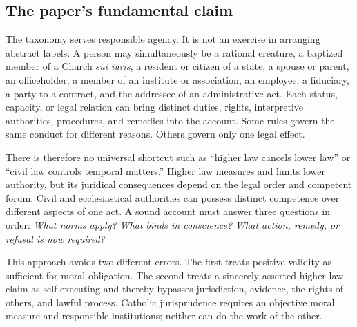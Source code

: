 \subsection{The paper's fundamental claim}

The taxonomy serves responsible agency. It is not an exercise in arranging abstract labels. A person may simultaneously be a rational creature, a baptized member of a Church \emph{sui iuris}, a resident or citizen of a state, a spouse or parent, an officeholder, a member of an institute or association, an employee, a fiduciary, a party to a contract, and the addressee of an administrative act. Each status, capacity, or legal relation can bring distinct duties, rights, interpretive authorities, procedures, and remedies into the account. Some rules govern the same conduct for different reasons. Others govern only one legal effect.

There is therefore no universal shortcut such as ``higher law cancels lower law'' or ``civil law controls temporal matters.'' Higher law measures and limits lower authority, but its juridical consequences depend on the legal order and competent forum. Civil and ecclesiastical authorities can possess distinct competence over different aspects of one act. A sound account must answer three questions in order: \emph{What norms apply? What binds in conscience? What action, remedy, or refusal is now required?}

This approach avoids two different errors. The first treats positive validity as sufficient for moral obligation. The second treats a sincerely asserted higher-law claim as self-executing and thereby bypasses jurisdiction, evidence, the rights of others, and lawful process. Catholic jurisprudence requires an objective moral measure and responsible institutions; neither can do the work of the other.


